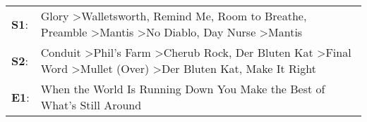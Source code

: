 \begin{supertabular}{p{0.03\textwidth}p{0.92\textwidth}}
 \textbf{S1}:  &  Glory\textsuperscript{} \textgreater \enspace Walletsworth\textsuperscript{}, \enspace Remind Me\textsuperscript{}, \enspace Room to Breathe\textsuperscript{}, \enspace Preamble\textsuperscript{} \textgreater \enspace Mantis\textsuperscript{} \textgreater \enspace No Diablo\textsuperscript{}, \enspace Day Nurse\textsuperscript{} \textgreater \enspace Mantis\textsuperscript{}  \enspace  \\
 \textbf{S2}:  &     Conduit\textsuperscript{} \textgreater \enspace Phil's Farm\textsuperscript{} \textgreater \enspace Cherub Rock\textsuperscript{}, \enspace Der Bluten Kat\textsuperscript{} \textgreater \enspace Final Word\textsuperscript{} \textgreater \enspace Mullet (Over)\textsuperscript{} \textgreater \enspace Der Bluten Kat\textsuperscript{}, \enspace Make It Right\textsuperscript{}  \enspace  \\
 \textbf{E1}:  &                                                                                                                                                                                                                                                                                                  When the World Is Running Down You Make the Best of What's Still Around\textsuperscript{}  \enspace  \\
\end{supertabular}
